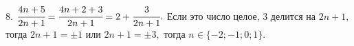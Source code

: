 8. $\cfrac{4n+5}{2n+1}=\cfrac{4n+2+3}{2n+1}=2+\cfrac{3}{2n+1}.$ Если это число целое, 3 делится на $2n+1,$ тогда $2n+1=\pm1$ или $2n+1=\pm3,$ тогда
$n\in\{-2; -1; 0; 1\}.$\\
